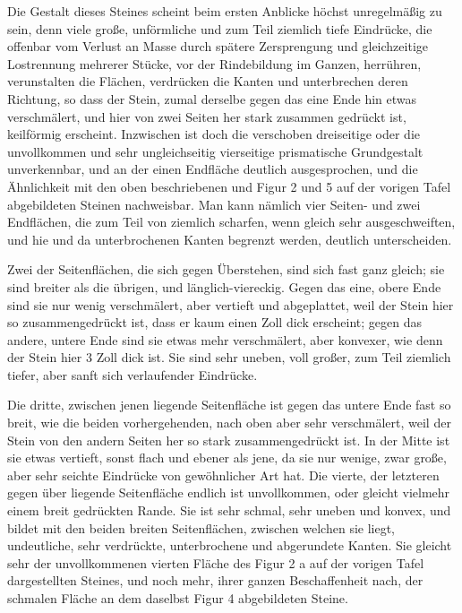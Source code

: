 \documentclass[a4paper, 11pt, oneside, german]{article}
\begin{document}
Die Gestalt dieses Steines scheint beim ersten Anblicke höchst unregelmäßig zu sein, denn viele große, unförmliche und zum Teil ziemlich tiefe Eindrücke, die offenbar vom Verlust an Masse durch spätere Zersprengung und gleichzeitige Lostrennung mehrerer Stücke, vor der Rindebildung im Ganzen, herrühren, verunstalten die Flächen, verdrücken die Kanten und unterbrechen deren Richtung, so dass der Stein, zumal derselbe gegen das eine Ende hin etwas verschmälert, und hier von zwei Seiten her stark zusammen gedrückt ist, keilförmig erscheint. Inzwischen ist doch die verschoben dreiseitige oder die unvollkommen und sehr ungleichseitig vierseitige prismatische Grundgestalt unverkennbar, und an der einen Endfläche deutlich ausgesprochen, und die Ähnlichkeit mit den oben beschriebenen und Figur 2 und 5 auf der vorigen Tafel abgebildeten Steinen nachweisbar. Man kann nämlich vier Seiten- und zwei Endflächen, die zum Teil von ziemlich scharfen, wenn gleich sehr ausgeschweiften, und hie und da unterbrochenen Kanten begrenzt werden, deutlich unterscheiden.

Zwei der Seitenflächen, die sich gegen Überstehen, sind sich fast ganz gleich; sie sind breiter als die übrigen, und länglich-viereckig. Gegen das eine, obere Ende sind sie nur wenig verschmälert, aber vertieft und abgeplattet, weil der Stein hier so zusammengedrückt ist, dass er kaum einen Zoll dick erscheint; gegen das andere, untere Ende sind sie etwas mehr verschmälert, aber konvexer, wie denn der Stein hier 3 Zoll dick ist. Sie sind sehr uneben, voll großer, zum Teil ziemlich tiefer, aber sanft sich verlaufender Eindrücke.

Die dritte, zwischen jenen liegende Seitenfläche ist gegen das untere Ende fast so breit, wie die beiden vorhergehenden, nach oben aber sehr verschmälert, weil der Stein von den andern Seiten her so stark zusammengedrückt ist. In der Mitte ist sie etwas vertieft, sonst flach und ebener als jene, da sie nur wenige, zwar große, aber sehr seichte Eindrücke von gewöhnlicher Art hat. Die vierte, der letzteren gegen über liegende Seitenfläche endlich ist unvollkommen, oder gleicht vielmehr einem breit gedrückten Rande. Sie ist sehr schmal, sehr uneben und konvex, und bildet mit den beiden breiten Seitenflächen, zwischen welchen sie liegt, undeutliche, sehr verdrückte, unterbrochene und abgerundete Kanten. Sie gleicht sehr der unvollkommenen vierten Fläche des Figur 2 a auf der vorigen Tafel dargestellten Steines, und noch mehr, ihrer ganzen Beschaffenheit nach, der schmalen Fläche an dem daselbst Figur 4 abgebildeten Steine.
\end{document}
